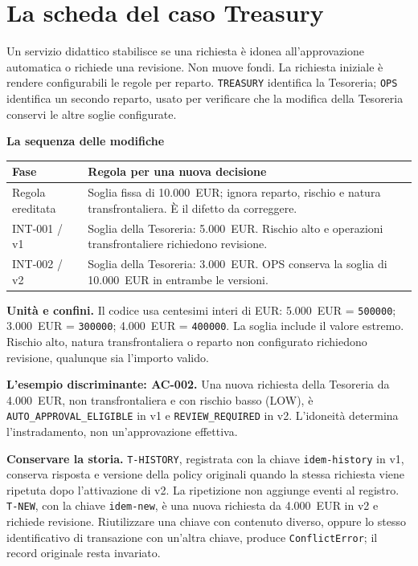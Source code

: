 \clearpage
\begingroup
\small
\section*{La scheda del caso Treasury}\label{case:canonical-card}

Un servizio didattico stabilisce se una richiesta è idonea all'approvazione automatica o richiede una revisione. Non muove fondi. La richiesta iniziale è rendere configurabili le regole per reparto. \texttt{TREASURY} identifica la Tesoreria; \texttt{OPS} identifica un secondo reparto, usato per verificare che la modifica della Tesoreria conservi le altre soglie configurate.

\noindent\textbf{La sequenza delle modifiche}
\begin{center}
\begin{tabularx}{\linewidth}{@{}p{.25\linewidth}X@{}}\toprule
Fase & Regola per una nuova decisione\\\midrule
Regola ereditata & Soglia fissa di 10.000~EUR; ignora reparto, rischio e natura transfrontaliera. È il difetto da correggere.\\
\mbox{INT-001} / v1 & Soglia della Tesoreria: 5.000~EUR. Rischio alto e operazioni transfrontaliere richiedono revisione.\\
\mbox{INT-002} / v2 & Soglia della Tesoreria: 3.000~EUR. OPS conserva la soglia di 10.000~EUR in entrambe le versioni.\\\bottomrule
\end{tabularx}
\end{center}

\noindent\textbf{Unità e confini.} Il codice usa centesimi interi di EUR: 5.000~EUR = \texttt{500000}; 3.000~EUR = \texttt{300000}; 4.000~EUR = \texttt{400000}. La soglia include il valore estremo. Rischio alto, natura transfrontaliera o reparto non configurato richiedono revisione, qualunque sia l'importo valido.

\noindent\textbf{L'esempio discriminante: \mbox{AC-002}.} Una nuova richiesta della Tesoreria da 4.000~EUR, non transfrontaliera e con rischio basso (LOW), è \texttt{AUTO\_APPROVAL\_ELIGIBLE} in v1 e \texttt{REVIEW\_REQUIRED} in v2. L'idoneità determina l'instradamento, non un'approvazione effettiva.

\noindent\textbf{Conservare la storia.} \texttt{T-HISTORY}, registrata con la chiave \texttt{idem-history} in v1, conserva risposta e versione della policy originali quando la stessa richiesta viene ripetuta dopo l'attivazione di v2. La ripetizione non aggiunge eventi al registro. \texttt{T-NEW}, con la chiave \texttt{idem-new}, è una nuova richiesta da 4.000~EUR in v2 e richiede revisione. Riutilizzare una chiave con contenuto diverso, oppure lo stesso identificativo di transazione con un'altra chiave, produce \texttt{ConflictError}; il record originale resta invariato.


